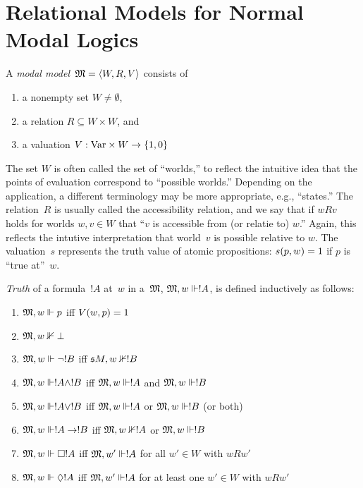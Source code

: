 \documentclass[modal-logic]{subfiles}
\begin{document}
\section{Relational Models for Normal Modal Logics}

\begin{defn}
A \emph{modal model}~$\mathfrak M = \langle W, R, V\rangle$ consists of
\begin{enumerate}
\item a nonempty set $ W\neq \emptyset$,
\item a relation $R \subseteq W \times W$, and
\item a valuation $V: \mathrm{Var} \times W \to \{1, 0\}$
\end{enumerate}
\end{defn}

The set $W$ is often called the set of ``worlds,'' to reflect the
intuitive idea that the points of evaluation correspond to ``possible
worlds.'' Depending on the application, a different terminology may be
more appropriate, e.g., ``states.''  The relation~$R$ is usually
called the accessibility relation, and we say that if $wRv$ holds for
worlds $w, v \in W$ that ``$v$ is accessible from (or relatie to)
$w$.''  Again, this reflects the intutive interpretation that
world~$v$ is possible relative to $w$.  The valuation~$s$
represents the truth value of atomic propositions: $s(p, w) = 1$
if $p$ is ``true at''~$w$.

\begin{defn}\label{defn:mmodels}
\emph{Truth} of a formula~$!A$  at~$w$ in a~$\mathfrak M$, $\mathfrak M, w
\Vdash !A$, is defined inductively as follows:
\begin{enumerate}
\item $\mathfrak M, w \Vdash p$ iff $V(w, p) = 1$
\item $\mathfrak M, w \nVdash \bot$ 
\item $\mathfrak M, w \Vdash \lnot !B$ iff $\mathfrak s M, w \nVdash !B$
\item $\mathfrak M, w \Vdash !A \land !B$ iff $\mathfrak M, w \Vdash !A$ and
  $\mathfrak M, w \Vdash !B$
\item $\mathfrak M, w \Vdash !A \lor !B$ iff $\mathfrak M, w \Vdash !A$ or
  $\mathfrak M, w \Vdash !B$ (or both)
\item $\mathfrak M, w \Vdash !A \to !B$ iff $\mathfrak M, w \nVdash !A$ or
  $\mathfrak M, w \Vdash !B$
\item\label{defn:sub:mmodels-box} $\mathfrak M, w \Vdash \Box !A$ iff $\mathfrak M, w'
  \Vdash !A$ for all $w' \in W$ with $wRw'$
\item $\mathfrak M, w \Vdash \Diamond !A$ iff $\mathfrak M, w' \Vdash !A$ for
  at least one $w' \in W$ with $wRw'$
\end{enumerate} 
\end{defn}
\end{document}
